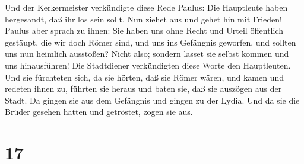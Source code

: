  Und der Kerkermeister verkündigte diese Rede Paulus: Die
Hauptleute haben hergesandt, daß ihr los sein sollt. Nun ziehet aus und
gehet hin mit Frieden!  Paulus aber sprach zu ihnen: Sie
haben uns ohne Recht und Urteil öffentlich gestäupt, die wir doch Römer
sind, und uns ins Gefängnis geworfen, und sollten uns nun heimlich
ausstoßen? Nicht also; sondern lasset sie selbst kommen und uns
hinausführen!  Die Stadtdiener verkündigten diese Worte den
Hauptleuten. Und sie fürchteten sich, da sie hörten, daß sie Römer
wären,  und kamen und redeten ihnen zu, führten sie heraus
und baten sie, daß sie auszögen aus der Stadt.  Da gingen
sie aus dem Gefängnis und gingen zu der Lydia. Und da sie die Brüder
gesehen hatten und getröstet, zogen sie aus.

\hypertarget{section-16}{%
\section{17}\label{section-16}}

